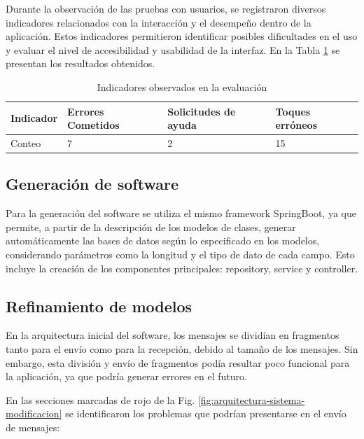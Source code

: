 \documentclass[lettersize,journal]{IEEEtran}
\begin{document}
\begin{itemize}
	Durante la observación de las pruebas con usuarios, se registraron diversos indicadores relacionados con la interacción y el desempeño dentro de la aplicación. Estos indicadores permitieron identificar posibles dificultades en el uso y evaluar el nivel de accesibilidad y usabilidad de la interfaz. En la Tabla \ref{tab:indicadores_evaluacion} se presentan los resultados obtenidos.
	
	\begin{table}[H]
		\centering
		\caption{Indicadores observados en la evaluación}
		\label{tab:indicadores_evaluacion}
		\begin{tabular}{|p{1cm}|p{1.5cm}|p{1.5cm}|p{1.5cm}|}
			\hline
			\textbf{Indicador} & \textbf{Errores Cometidos} & \textbf{Solicitudes de ayuda} & \textbf{Toques erróneos} \\
			\hline
			Conteo & 7 & 2 & 15 \\
			\hline
		\end{tabular}
	\end{table}
	
	

\end{itemize}

\subsection {Generación de software}

\noindent Para la generación del software se utiliza el mismo framework SpringBoot, ya que permite, a partir de la descripción de los modelos de clases, generar automáticamente las bases de datos según lo especificado en los modelos, considerando parámetros como la longitud y el tipo de dato de cada campo. Esto incluye la creación de los componentes principales: repository, service y controller. 

\subsection {Refinamiento de modelos}

\noindent En la arquitectura inicial del software, los mensajes se dividían en fragmentos tanto para el envío como para la recepción, debido al tamaño de los mensajes. Sin embargo, esta división y envío de fragmentos podía resultar poco funcional para la aplicación, ya que podría generar errores en el futuro.

\noindent En las secciones marcadas de rojo de la Fig. \ref{fig:arquitectura-sistema-modificacion} se identificaron los problemas que podrían presentarse en el envío de mensajes:
\end{document}
